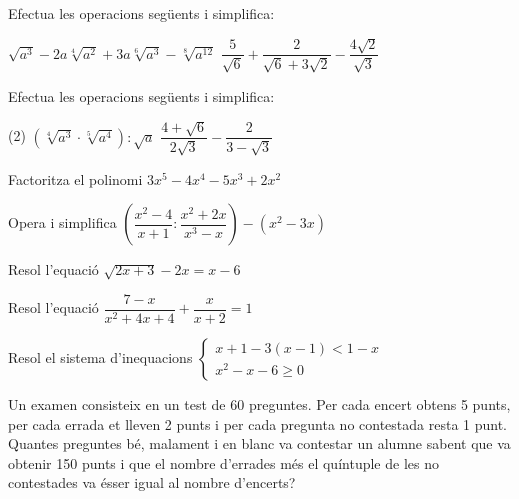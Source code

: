 

\begin{mylist}
	
\exer[2] Efectua les operacions següents i simplifica:
\begin{tasks}
	\task $\sqrt{a^3} - 2a \sqrt[4]{a^2} + 3a \sqrt[6]{a^3} - \sqrt[8]{a^{12}}$
	\task $\dfrac{5}{\sqrt{6}} + \dfrac{2}{\sqrt{6}+3\sqrt{2}} - \dfrac{4\sqrt{2}}{\sqrt{3}}$
\end{tasks}

\exer[2] Efectua les operacions següents i simplifica:
\begin{tasks}(2)
	\task $\left( \sqrt[4]{a^3} \cdot \sqrt[5]{a^4} \right): \sqrt{a}$
	\task $\dfrac{4+\sqrt{6}}{2\sqrt{3}}  -  \dfrac{2}{3-\sqrt{3}}$
\end{tasks}

\exer[2] Factoritza el polinomi $3x^5 - 4x^4 - 5x^3 + 2x^2$

\exer[2] Opera i simplifica $\left( \dfrac{x^2-4}{x+1} : \dfrac{x^2+2x}{x^3-x} \right) - (x^2-3x)$

\exer[2] Resol l'equació $\sqrt{2x+3} - 2x = x-6$

\exer[2] Resol l'equació $\dfrac{7-x}{x^2+4x+4} + \dfrac{x}{x+2}=1$

\exer[2] Resol el sistema d'inequacions $\left\{ \begin{array}{l} 
x+1-3(x-1)<1-x \\ x^2-x-6\ge 0 
\end{array}\right.$


\exer[2] Un examen consisteix en un test de 60 preguntes. Per cada encert obtens 5 punts, per cada errada et lleven 2 punts i per cada pregunta no contestada resta 1 punt. Quantes preguntes bé, malament i en blanc va contestar un alumne sabent que va obtenir 150 punts i que el nombre d'errades més el quíntuple de les no contestades va ésser igual al nombre d'encerts? 


\end{mylist}
